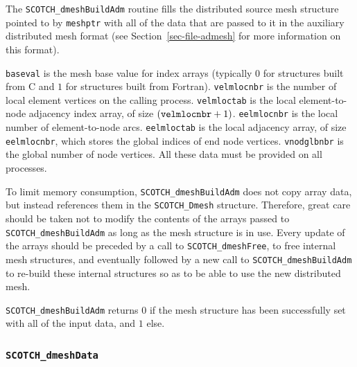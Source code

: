 \begin{itemize}
\progdes

The \texttt{SCOTCH\_dmeshBuildAdm} routine fills the distributed source
mesh structure pointed to by \texttt{meshptr} with all of the data that
are passed to it in the auxiliary distributed mesh format (see
Section~\ref{sec-file-admesh} for more information on this format).

\texttt{baseval} is the mesh base value for index arrays (typically
$0$ for structures built from C and $1$ for structures built from
Fortran). \texttt{velmlocnbr} is the number of local element vertices
on the calling process.
\texttt{velmloctab} is the local element-to-node adjacency index
array, of size $(\texttt{velm\lbt loc\lbt nbr} + 1)$.
\texttt{eelmlocnbr} is the local number of element-to-node arcs.
\texttt{eelmloctab} is the local adjacency array, of size
\texttt{eelmlocnbr}, which stores the global indices of end node
vertices.
\texttt{vnodglbnbr} is the global number of node vertices.
All these data must be provided on all processes.

To limit memory consumption,
\texttt{SCOTCH\_\lbt dmesh\lbo Build\lbo Adm} does not copy array
data, but instead references them in the \texttt{SCOTCH\_\lbt Dmesh}
structure. Therefore, great care should be taken not to modify the
contents of the arrays passed to
\texttt{SCOTCH\_\lbt dmesh\lbt Build\lbo Adm} as long as the mesh
structure is in use. Every update of the arrays should be preceded by
a call to \texttt{SCOTCH\_\lbt dmesh\lbo Free}, to free internal mesh
structures, and eventually followed by a new call to
\texttt{SCOTCH\_\lbt dmesh\lbo Build\lbo Adm} to
re-build these internal structures so as to be able to use the new
distributed mesh.


\progret

{\tt SCOTCH\_dmeshBuildAdm} returns $0$ if the mesh structure has been
successfully set with all of the input data, and $1$ else.
\end{itemize}

\subsubsection{\texttt{SCOTCH\_dmeshData}}
\label{sec-lib-func-dmeshdata}

